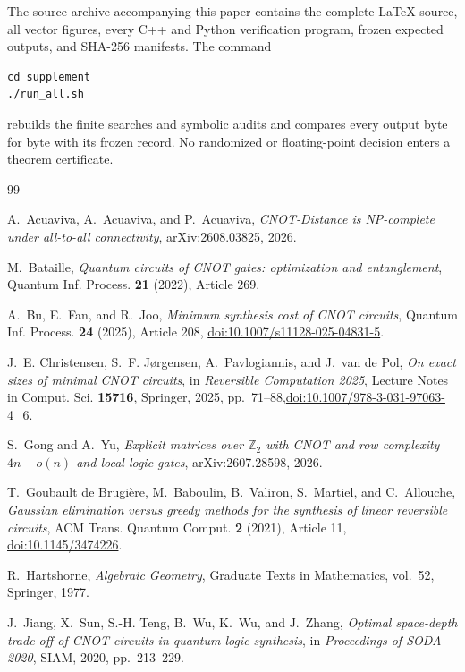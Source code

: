 \documentclass[11pt]{amsart}
\numberwithin{equation}{section}
\theoremstyle{definition}
\theoremstyle{remark}
\begin{document}
The source archive accompanying this paper contains the complete LaTeX source, all vector figures, every C++ and Python verification program, frozen expected outputs, and SHA-256 manifests.  The command
\begin{verbatim}
cd supplement
./run_all.sh
\end{verbatim}
rebuilds the finite searches and symbolic audits and compares every output byte for byte with its frozen record.  No randomized or floating-point decision enters a theorem certificate.

\begin{thebibliography}{99}

A.~Acuaviva, A.~Acuaviva, and P.~Acuaviva,
\emph{CNOT-Distance is NP-complete under all-to-all connectivity},
arXiv:2608.03825, 2026.

M.~Bataille,
\emph{Quantum circuits of CNOT gates: optimization and entanglement},
Quantum Inf. Process. \textbf{21} (2022), Article 269.

A.~Bu, E.~Fan, and R.~Joo,
\emph{Minimum synthesis cost of CNOT circuits},
Quantum Inf. Process. \textbf{24} (2025), Article 208,
\href{https://doi.org/10.1007/s11128-025-04831-5}{doi:10.1007/s11128-025-04831-5}.

J.~E. Christensen, S.~F. J\o rgensen, A.~Pavlogiannis, and J.~van de Pol,
\emph{On exact sizes of minimal CNOT circuits},
in \emph{Reversible Computation 2025}, Lecture Notes in Comput. Sci. \textbf{15716}, Springer, 2025, pp.~71--88,\newline\href{https://doi.org/10.1007/978-3-031-97063-4_6}{doi:10.1007/978-3-031-97063-4\_6}.

S.~Gong and A.~Yu,
\emph{Explicit matrices over $\mathbb Z_2$ with CNOT and row complexity $4n-o(n)$ and local logic gates},
arXiv:2607.28598, 2026.

T.~Goubault de Brugi\`ere, M.~Baboulin, B.~Valiron, S.~Martiel, and C.~Allouche,
\emph{Gaussian elimination versus greedy methods for the synthesis of linear reversible circuits},
ACM Trans. Quantum Comput. \textbf{2} (2021), Article 11,
\href{https://doi.org/10.1145/3474226}{doi:10.1145/3474226}.

R.~Hartshorne,
\emph{Algebraic Geometry},
Graduate Texts in Mathematics, vol.~52, Springer, 1977.

J.~Jiang, X.~Sun, S.-H. Teng, B.~Wu, K.~Wu, and J.~Zhang,
\emph{Optimal space-depth trade-off of CNOT circuits in quantum logic synthesis},
in \emph{Proceedings of SODA 2020}, SIAM, 2020, pp.~213--229.


\end{thebibliography}
\end{document}
